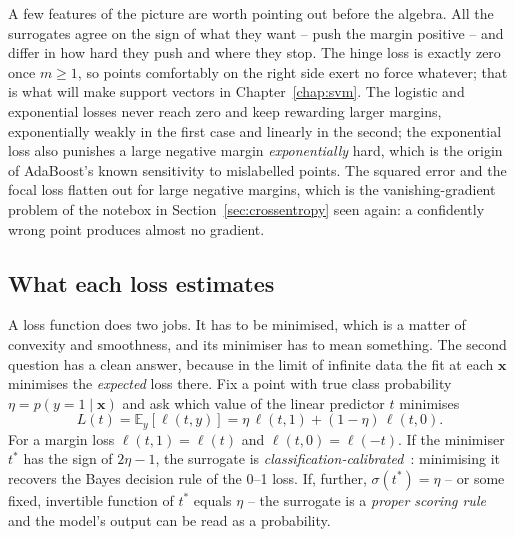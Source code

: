 A few features of the picture are worth pointing out before the algebra.  All
the surrogates agree on the sign of what they want -- push the margin
positive -- and differ in how hard they push and where they stop.  The
hinge loss is exactly zero once $m\ge1$, so points comfortably on the right
side exert no force whatever; that is what will make support vectors in
Chapter~\ref{chap:svm}.  The logistic and exponential losses never reach zero
and keep rewarding larger margins, exponentially weakly in the first case and
linearly in the second; the exponential loss also punishes a large negative
margin \emph{exponentially} hard, which is the origin of AdaBoost's known
sensitivity to mislabelled points.  The squared error and the focal loss
flatten out for large negative margins, which is the vanishing-gradient
problem of the notebox in Section~\ref{sec:crossentropy} seen again: a
confidently wrong point produces almost no gradient.

\subsection{What each loss estimates}
\label{sec:losscalibration}

A loss function does two jobs.  It has to be minimised, which is a matter of
convexity and smoothness, and its minimiser has to mean something.  The
second question has a clean answer, because in the limit of infinite data the
fit at each $\bm{x}$ minimises the \emph{expected} loss there.  Fix a point
with true class probability $\eta=p(y=1\mid\bm{x})$ and ask which value of the
linear predictor $t$ minimises
\begin{equation}
  L(t) = \mathbb{E}_{y}\left[\ell(t,y)\right]
       = \eta\,\ell(t,1) + (1-\eta)\,\ell(t,0).
  \label{eq:5-expectedloss}
\end{equation}
For a margin loss $\ell(t,1)=\ell(t)$ and $\ell(t,0)=\ell(-t)$.  If the
minimiser $t^{*}$ has the sign of $2\eta-1$, the surrogate is
\emph{classification-calibrated}~\cite{bartlett2006}: minimising it recovers
the Bayes decision rule of the 0--1 loss.  If, further, $\sigma(t^{*})=\eta$
-- or some fixed, invertible function of $t^{*}$ equals $\eta$ -- the
surrogate is a \emph{proper scoring rule}~\cite{brier1950,gneiting2007} and the
model's output can be read as a probability.

